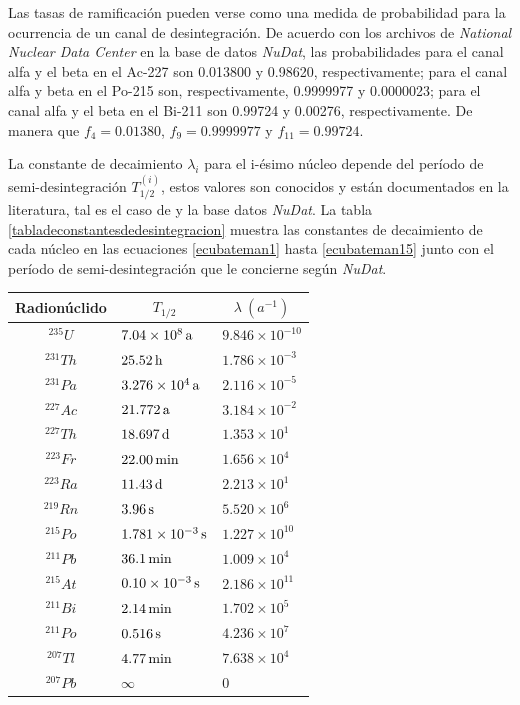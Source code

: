 Las tasas de ramificación pueden verse como una medida de probabilidad para la ocurrencia de un canal de desintegración. De acuerdo con los archivos de \textit{National Nuclear Data Center} en la base de datos \textit{NuDat}, las probabilidades para el canal alfa y el beta en el Ac-227 son 0.013800 y 0.98620, respectivamente; para el canal alfa y beta en el Po-215 son, respectivamente, 0.9999977 y 0.0000023; para el canal alfa y el beta en el Bi-211 son 0.99724 y 0.00276, respectivamente. De manera que $f_4=0.01380$, $f_9=0.9999977$ y $f_{11}=0.99724$.

La constante de decaimiento $\lambda_i$ para el i-ésimo núcleo depende del período de semi-desintegración $T_{1/2}^{(i)}$, estos valores son conocidos y están documentados en la literatura, tal es el caso de \cite{Flanagan1954} y la base datos \textit{NuDat}. La tabla \ref{tabladeconstantesdedesintegracion} muestra las constantes de decaimiento de cada núcleo en las ecuaciones \ref{ecubateman1} hasta \ref{ecubateman15} junto con el período de semi-desintegración que le concierne según \textit{NuDat}.

\begin{center}
	\noindent\begin{tabular}{|c|l|l|}
		\hline
		Radionúclido & \multicolumn{1}{c|}{$T_{1/2}$} & \multicolumn{1}{c|}{$\lambda\ (a^{-1})$} \\\hline\hline 
		$^{235}U$  & $\unit[7.04\times 10^8]{a}$ & $9.846\times 10^{-10}$ \\
		$^{231}Th$ & $\unit[25.52]{h}$ & $1.786\times 10^{-3}$ \\
		$^{231}Pa$ & $\unit[3.276\times 10^4]{a}$ & $2.116\times 10^{-5}$ \\
		$^{227}Ac$ & $\unit[21.772]{a}$ & $3.184\times 10^{-2}$ \\
		$^{227}Th$ & $\unit[18.697]{d}$ & $1.353\times 10^{1}$ \\
		$^{223}Fr$ & $\unit[22.00]{min}$ & $1.656\times 10^{4}$ \\
		$^{223}Ra$ & $\unit[11.43]{d}$ & $2.213\times 10^{1}$ \\
		$^{219}Rn$ & $\unit[3.96]{s}$ & $5.520\times 10^{6}$ \\
		$^{215}Po$ & $\unit[1.781\times 10^{-3}]{s}$ & $1.227\times 10^{10}$ \\
		$^{211}Pb$ & $\unit[36.1]{min}$ & $1.009\times 10^{4}$ \\
		$^{215}At$ & $\unit[0.10\times 10^{-3}]{s}$ & $2.186\times 10^{11}$ \\
		$^{211}Bi$ & $\unit[2.14]{min}$ & $1.702\times 10^{5}$ \\
		$^{211}Po$ & $\unit[0.516]{s}$ & $4.236\times 10^{7}$ \\
		$^{207}Tl$ & $\unit[4.77]{min}$ & $7.638\times 10^{4}$ \\
		$^{207}Pb$ & $\infty$ & 0\\\hline
	\end{tabular}
	\label{tabladeconstantesdedesintegracion}
\end{center}

